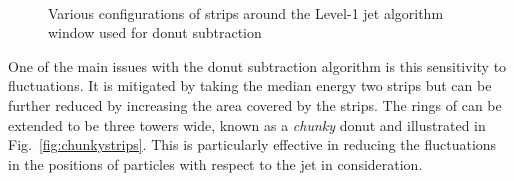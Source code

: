 \begin{figure}
  \centering
  ~ 
  ~
  \\
  \caption{Various configurations of \TT strips around the Level-1 jet
  algorithm window used for donut subtraction}
  \label{fig:alldonutstrips}
\end{figure}

One of the main issues with the donut subtraction algorithm is this
sensitivity to fluctuations. It is mitigated by taking the median energy two strips
but can be further reduced by increasing the area covered by the
strips. The rings of \TTs can be extended to be three towers wide,
known as a \emph{chunky} donut and illustrated in
Fig.~\ref{fig:chunkystrips}. This is particularly effective in
reducing the fluctuations in the positions of \PU particles with
respect to the jet in consideration.

